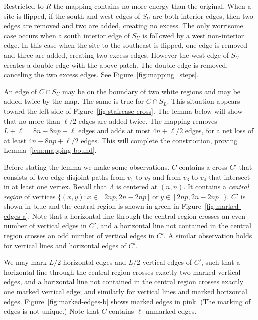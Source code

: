 \documentclass[letterpaper,english,numberwithinsect]{amsart}
\begin{document}
Restricted to $R$ the mapping contains no more energy than the original. 
When a site is flipped, if the south and west edges of $S_U$ are both interior edges, then two edges are removed and two are added, creating no excess.
The only worrisome case occurs when a south interior edge of $S_U$ is followed by a west non-interior edge. 
In this case when the site to the southeast is flipped, one edge is removed and three are added, creating two excess edges.
However the west edge of $S_U$ creates a double edge with the above-patch. 
The double edge is removed, canceling the two excess edges. 
See Figure~\ref{fig:mapping_steps}.

An edge of $C \cap S_U$ may be on the boundary of two white regions and may be added twice by the map. The same is true for $C \cap S_L$. This situation appears toward the left side of Figure~\ref{fig:staircase-cross}. The lemma below will show that no more than $\ell/2$ edges are added twice. The mapping removes $L + \ell = 8n-8np + \ell$ edges and adds at most $4n + \ell/2$ edges, for a net loss of at least $4n-8np+\ell/2$ edges. This will complete the construction, proving Lemma~\ref{lem:mapping-bound}.

Before stating the lemma we make some observations. $C$ contains a cross $C'$ that consists of two edge-disjoint paths from $v_1$ to $v_2$ and from $v_3$ to $v_4$ that intersect in at least one vertex. Recall that $\overline{\Lambda}$ is centered at $(n, n)$. It contains a {\em central region} of vertices
$\{(x, y): x \in [2np, 2n-2np] \mathrm{~or~} y \in [2np, 2n-2np]\}$. $C'$ is shown in blue and the central region is shown in green in Figure~\ref{fig:marked-edges-a}. Note that a horizontal line through the central region crosses an even number of vertical edges in $C'$, and a horizontal line not contained in the central region crosses an odd number of vertical edges in $C'$. A similar observation holds for vertical lines and horizontal edges of $C'$. 

We may mark $L/2$ horizontal edges and $L/2$ vertical edges of $C'$, such that a horizontal line through the central region crosses exactly two marked vertical edges, and a horizontal line not contained in the central region crosses exactly one marked vertical edge; and similarly for vertical lines and marked horizontal edges. Figure~\ref{fig:marked-edges-b} shows marked edges in pink. (The marking of edges is not unique.) Note that $C$ contains $\ell$ unmarked edges.
 
\end{document}

